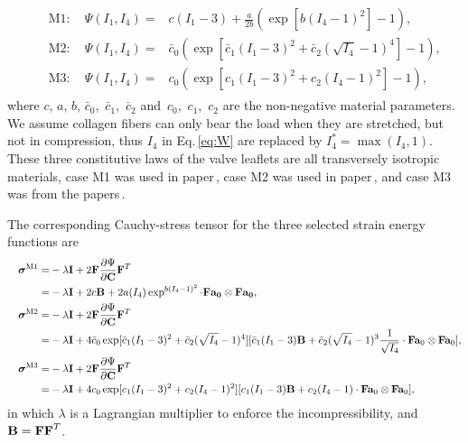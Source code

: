 \documentclass[fleqn,10pt]{wlscirep}
\def\bm#1{\mbox{\boldmath{$#1$}}}
\newcommand*{\V}[1]{\bm{\mathbf #1}}
\begin{document}
\begin{eqnarray}
\begin{split}
&&\text{M}1:\quad\Psi (I_{1},I_{4})=&c(I_{1}-3)+\frac{a}{2b}\left( \exp[{b(I_{4}-1)^{2}}]-1\right) ,
\\
&&\text{M}2:\quad\Psi (I_{1},I_{4})=&\bar{c}_{0}\left( \exp[\bar{c}_{1}(I_{1}-3)^{2}+\bar{c}_{2}(\sqrt{I_{4}}-1)^{4}]-1\right) ,
\\
&&\text{M}3:\quad\Psi (I_{1},I_{4})=&c_{0}\left( \exp[c_{1}(I_{1}-3)^{2}+c_{2}(I_{4}-1)^{2}]-1\right) ,
\end{split}
\label{eq:W}
\end{eqnarray}
where $c$, $a$, $b$, $\bar{c}_{0}$,~$\bar{c}_{1}$,~$\bar{c}_{2}$ and~$c_{0}$,~$c_{1}$,~$c_{2}$ are the non-negative material parameters. We assume collagen fibers can only bear the load when they are stretched, but not in compression, thus $I_4$ in Eq.\,\ref{eq:W} are replaced by $I_4^* = \max({I_4, 1})$. These three constitutive laws of the valve leaflets are all transversely isotropic materials, case M1 was used in paper\,\cite{Hao2014A}, case M2 was used in paper\,\cite{Prot2006An}, and case M3 was from the papers\,\cite{Prot2009Nonlinear,Prot2009Finite}.

The corresponding Cauchy-stress tensor for the three selected strain energy functions are
\begin{eqnarray}
\begin{split}
&&\V{\sigma}^\text{M1}=&-\lambda \mathbf{I}+2\mathbf{F}\frac{\partial \Psi}{\partial \mathbf{C}}\mathbf{F}^{T}\\
&&=&-\lambda\mathbf{I}+2c\mathbf{B}+2a(I_{4})\exp^{b(I_{4}-1)^{2}}\cdot \V{F} \V{a_0}\otimes \V{F}\V{a_0},\label{eq:sigma2}\\
&&\V\sigma^{\text{M2}}=&-\lambda \mathbf{I}+2\mathbf{F}\frac{\partial \Psi}{\partial \mathbf{C}}\mathbf{F}^{T}\\
&&=&-\lambda\mathbf{I}+4\bar{c}_{0}\exp[\bar{c}_{1}(I_{1}-3)^{2}+\bar{c}_{2}(\sqrt{I_{4}}-1)^{4}][\bar{c}_{1}(I_{1}-3)\mathbf{B}
+\bar{c}_{2}(\sqrt{I_{4}}-1)^{3}\frac{1}{\sqrt{I_{4}}}\cdot \mathbf{F}\mathbf{a}_{0}\otimes \mathbf{F}\mathbf{a}_{0}],\label{eq:sigma3}\\
&&\V\sigma^{\text{M3}}=&-\lambda \mathbf{I}+2\mathbf{F}\frac{\partial \Psi}{\partial \mathbf{C}}\mathbf{F}^{T}\\
&&=&-\lambda\mathbf{I}+4c_{0}\exp[c_{1}(I_{1}-3)^{2}+c_{2}(I_{4}-1)^{2}][c_{1}(I_{1}-3)\mathbf{B}+c_{2}(I_{4}-1)\cdot\mathbf{F}\mathbf{a}_{0}\otimes \mathbf{F}\mathbf{a}_{0}]\label{eq:sigma4},
\end{split}
\end{eqnarray}
in which $\lambda$ is a Lagrangian multiplier to enforce the incompressibility, and $\V{B} = \V{F}\V{F}^T$.
\end{document}
